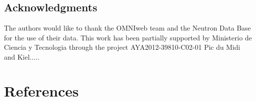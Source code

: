 \documentclass[a4paper]{jpconf}
\begin{document}
\subsection*{Acknowledgments} 
The authors would like to thank the OMNIweb team and the Neutron
Data Base for the use of their data. This work has been partially supported by
Ministerio de Ciencia y Tecnologia through the project AYA2012-39810-C02-01
Pic du Midi and Kiel.....



\section*{References}
 
\end{document}
